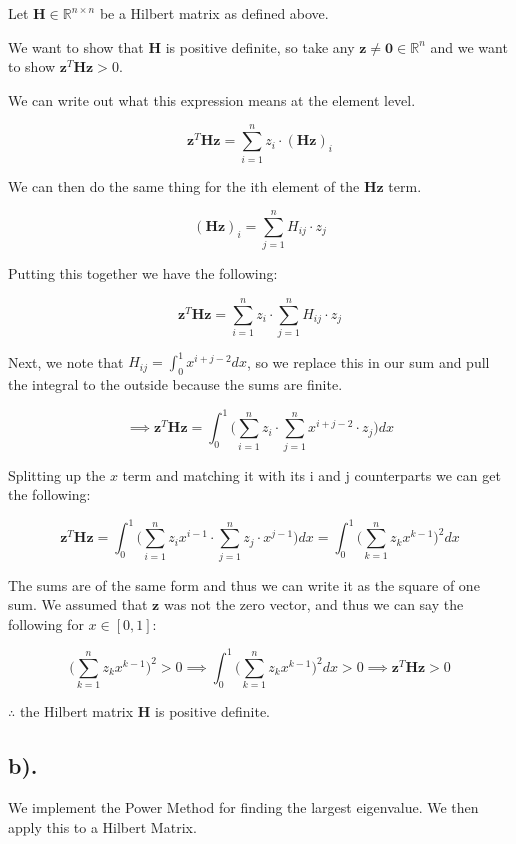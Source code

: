 \documentclass[11pt]{article}
\begin{document}
Let \(\mathbf{H}\in\mathbb{R}^{n\times n}\) be a Hilbert matrix as
defined above.

We want to show that \(\mathbf{H}\) is positive definite, so take any
\(\mathbf{z}\neq\mathbf{0}\in\mathbb{R}^n\) and we want to show
\(\mathbf{z}^T\mathbf{Hz}>0\).

    We can write out what this expression means at the element level.

\[
\mathbf{z}^T\mathbf{Hz} = \sum_{i=1}^n z_i\cdot(\mathbf{Hz})_i
\]

We can then do the same thing for the ith element of the \(\mathbf{Hz}\)
term.

\[ (\mathbf{Hz})_i = \sum_{j=1}^n H_{ij}\cdot z_j \]

    Putting this together we have the following:

\[
\mathbf{z}^T\mathbf{Hz} = \sum_{i=1}^n z_i\cdot\sum_{j=1}^n H_{ij}\cdot z_j
\]

Next, we note that \(H_{ij}=\int_0^1x^{i+j-2}dx\), so we replace this in
our sum and pull the integral to the outside because the sums are
finite.

\[ \implies \mathbf{z}^T\mathbf{Hz} = \int_0^1\big(\sum_{i=1}^n z_i\cdot\sum_{j=1}^n x^{i+j-2}\cdot z_j\big)dx \]

    Splitting up the \(x\) term and matching it with its i and j
counterparts we can get the following:

\[ \mathbf{z}^T\mathbf{Hz} = \int_0^1\big(\sum_{i=1}^n z_ix^{i-1}\cdot\sum_{j=1}^n z_j\cdot x^{j-1}\big)dx = \int_0^1\big( \sum_{k=1}^n z_kx^{k-1} \big)^2dx\]

The sums are of the same form and thus we can write it as the square of
one sum. We assumed that \(\mathbf{z}\) was not the zero vector, and
thus we can say the following for \(x\in[0,1]\):

\[ \big(\sum_{k=1}^n z_kx^{k-1}\big)^2 > 0 \implies \int_0^1\big( \sum_{k=1}^n z_kx^{k-1} \big)^2dx > 0 \implies \mathbf{z}^T\mathbf{Hz} > 0 \]

    \(\therefore\) the Hilbert matrix \(\mathbf{H}\) is positive definite.

    \hypertarget{b.}{%
\subsection*{b).}\label{b.}}

We implement the Power Method for finding the largest eigenvalue. We
then apply this to a Hilbert Matrix.
\end{document}
